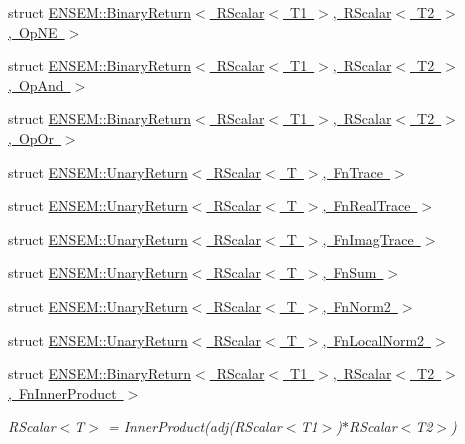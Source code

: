 \begin{DoxyCompactItemize}
\item 
struct \mbox{\hyperlink{structENSEM_1_1BinaryReturn_3_01RScalar_3_01T1_01_4_00_01RScalar_3_01T2_01_4_00_01OpNE_01_4}{E\+N\+S\+E\+M\+::\+Binary\+Return$<$ R\+Scalar$<$ T1 $>$, R\+Scalar$<$ T2 $>$, Op\+N\+E $>$}}
\item 
struct \mbox{\hyperlink{structENSEM_1_1BinaryReturn_3_01RScalar_3_01T1_01_4_00_01RScalar_3_01T2_01_4_00_01OpAnd_01_4}{E\+N\+S\+E\+M\+::\+Binary\+Return$<$ R\+Scalar$<$ T1 $>$, R\+Scalar$<$ T2 $>$, Op\+And $>$}}
\item 
struct \mbox{\hyperlink{structENSEM_1_1BinaryReturn_3_01RScalar_3_01T1_01_4_00_01RScalar_3_01T2_01_4_00_01OpOr_01_4}{E\+N\+S\+E\+M\+::\+Binary\+Return$<$ R\+Scalar$<$ T1 $>$, R\+Scalar$<$ T2 $>$, Op\+Or $>$}}
\item 
struct \mbox{\hyperlink{structENSEM_1_1UnaryReturn_3_01RScalar_3_01T_01_4_00_01FnTrace_01_4}{E\+N\+S\+E\+M\+::\+Unary\+Return$<$ R\+Scalar$<$ T $>$, Fn\+Trace $>$}}
\item 
struct \mbox{\hyperlink{structENSEM_1_1UnaryReturn_3_01RScalar_3_01T_01_4_00_01FnRealTrace_01_4}{E\+N\+S\+E\+M\+::\+Unary\+Return$<$ R\+Scalar$<$ T $>$, Fn\+Real\+Trace $>$}}
\item 
struct \mbox{\hyperlink{structENSEM_1_1UnaryReturn_3_01RScalar_3_01T_01_4_00_01FnImagTrace_01_4}{E\+N\+S\+E\+M\+::\+Unary\+Return$<$ R\+Scalar$<$ T $>$, Fn\+Imag\+Trace $>$}}
\item 
struct \mbox{\hyperlink{structENSEM_1_1UnaryReturn_3_01RScalar_3_01T_01_4_00_01FnSum_01_4}{E\+N\+S\+E\+M\+::\+Unary\+Return$<$ R\+Scalar$<$ T $>$, Fn\+Sum $>$}}
\item 
struct \mbox{\hyperlink{structENSEM_1_1UnaryReturn_3_01RScalar_3_01T_01_4_00_01FnNorm2_01_4}{E\+N\+S\+E\+M\+::\+Unary\+Return$<$ R\+Scalar$<$ T $>$, Fn\+Norm2 $>$}}
\item 
struct \mbox{\hyperlink{structENSEM_1_1UnaryReturn_3_01RScalar_3_01T_01_4_00_01FnLocalNorm2_01_4}{E\+N\+S\+E\+M\+::\+Unary\+Return$<$ R\+Scalar$<$ T $>$, Fn\+Local\+Norm2 $>$}}
\item 
struct \mbox{\hyperlink{structENSEM_1_1BinaryReturn_3_01RScalar_3_01T1_01_4_00_01RScalar_3_01T2_01_4_00_01FnInnerProduct_01_4}{E\+N\+S\+E\+M\+::\+Binary\+Return$<$ R\+Scalar$<$ T1 $>$, R\+Scalar$<$ T2 $>$, Fn\+Inner\+Product $>$}}
\begin{DoxyCompactList}\small\item\em R\+Scalar$<$\+T$>$ = Inner\+Product(adj(\+R\+Scalar$<$\+T1$>$)$\ast$\+R\+Scalar$<$\+T2$>$) \end{DoxyCompactList}\item 

\end{DoxyCompactItemize}
